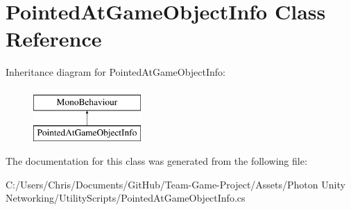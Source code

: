 \hypertarget{class_pointed_at_game_object_info}{}\section{Pointed\+At\+Game\+Object\+Info Class Reference}
\label{class_pointed_at_game_object_info}
Inheritance diagram for Pointed\+At\+Game\+Object\+Info\+:\begin{figure}[H]
\begin{center}
\leavevmode
\includegraphics[height=2.000000cm]{class_pointed_at_game_object_info}
\end{center}
\end{figure}


The documentation for this class was generated from the following file\+:\begin{DoxyCompactItemize}
\item 
C\+:/\+Users/\+Chris/\+Documents/\+Git\+Hub/\+Team-\/\+Game-\/\+Project/\+Assets/\+Photon Unity Networking/\+Utility\+Scripts/Pointed\+At\+Game\+Object\+Info.\+cs\end{DoxyCompactItemize}
